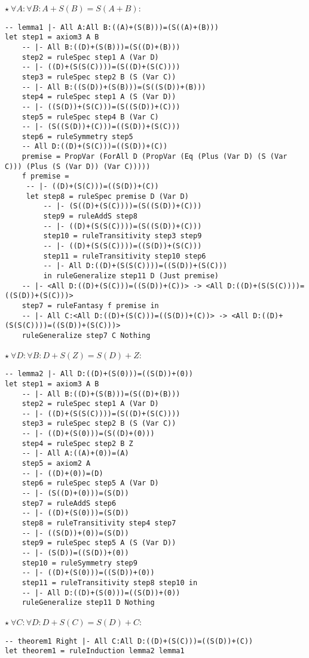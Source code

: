 \documentclass{article}
\begin{document}
\begin{minipage}[t]{0.49\textwidth}
$\star \ \forall A: \forall B: A + S(B) = S(A + B)$:

\begin{lstlisting}
-- lemma1 |- All A:All B:((A)+(S(B)))=(S((A)+(B)))
let step1 = axiom3 A B
    -- |- All B:((D)+(S(B)))=(S((D)+(B)))
    step2 = ruleSpec step1 A (Var D)
    -- |- ((D)+(S(S(C))))=(S((D)+(S(C))))
    step3 = ruleSpec step2 B (S (Var C))
    -- |- All B:((S(D))+(S(B)))=(S((S(D))+(B)))
    step4 = ruleSpec step1 A (S (Var D))
    -- |- ((S(D))+(S(C)))=(S((S(D))+(C)))
    step5 = ruleSpec step4 B (Var C)
    -- |- (S((S(D))+(C)))=((S(D))+(S(C)))
    step6 = ruleSymmetry step5
    -- All D:((D)+(S(C)))=((S(D))+(C))
    premise = PropVar (ForAll D (PropVar (Eq (Plus (Var D) (S (Var C))) (Plus (S (Var D)) (Var C)))))
    f premise =
     -- |- ((D)+(S(C)))=((S(D))+(C))
     let step8 = ruleSpec premise D (Var D)
         -- |- (S((D)+(S(C))))=(S((S(D))+(C)))
         step9 = ruleAddS step8
         -- |- ((D)+(S(S(C))))=(S((S(D))+(C)))
         step10 = ruleTransitivity step3 step9
         -- |- ((D)+(S(S(C))))=((S(D))+(S(C)))
         step11 = ruleTransitivity step10 step6
         -- |- All D:((D)+(S(S(C))))=((S(D))+(S(C)))
         in ruleGeneralize step11 D (Just premise)
    -- |- <All D:((D)+(S(C)))=((S(D))+(C))> -> <All D:((D)+(S(S(C))))=((S(D))+(S(C)))>
    step7 = ruleFantasy f premise in
    -- |- All C:<All D:((D)+(S(C)))=((S(D))+(C))> -> <All D:((D)+(S(S(C))))=((S(D))+(S(C)))>
    ruleGeneralize step7 C Nothing
\end{lstlisting}
\end{minipage}
\begin{minipage}[t]{0.49\textwidth}
$\star \ \forall D: \forall B: D + S(Z) = S(D) + Z$:

\begin{lstlisting}
-- lemma2 |- All D:((D)+(S(0)))=((S(D))+(0))
let step1 = axiom3 A B
    -- |- All B:((D)+(S(B)))=(S((D)+(B)))
    step2 = ruleSpec step1 A (Var D)
    -- |- ((D)+(S(S(C))))=(S((D)+(S(C))))
    step3 = ruleSpec step2 B (S (Var C))
    -- |- ((D)+(S(0)))=(S((D)+(0)))
    step4 = ruleSpec step2 B Z
    -- |- All A:((A)+(0))=(A)
    step5 = axiom2 A
    -- |- ((D)+(0))=(D)
    step6 = ruleSpec step5 A (Var D)
    -- |- (S((D)+(0)))=(S(D))
    step7 = ruleAddS step6
    -- |- ((D)+(S(0)))=(S(D))
    step8 = ruleTransitivity step4 step7
    -- |- ((S(D))+(0))=(S(D))
    step9 = ruleSpec step5 A (S (Var D))
    -- |- (S(D))=((S(D))+(0))
    step10 = ruleSymmetry step9
    -- |- ((D)+(S(0)))=((S(D))+(0))
    step11 = ruleTransitivity step8 step10 in
    -- |- All D:((D)+(S(0)))=((S(D))+(0))
    ruleGeneralize step11 D Nothing
\end{lstlisting}

$\star \ \forall C: \forall D: D + S(C) = S(D) + C$:

\begin{lstlisting}
-- theorem1 Right |- All C:All D:((D)+(S(C)))=((S(D))+(C))
let theorem1 = ruleInduction lemma2 lemma1
\end{lstlisting}
\end{minipage}
\end{document}
